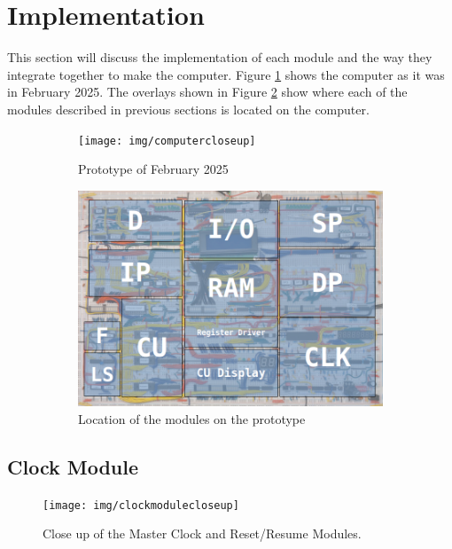 \section{Implementation} \label{sec:implementation}
This section will discuss the implementation of each module and the way they integrate together to make the computer. Figure \ref{fig:prototypea} shows the computer as it was in February 2025. The overlays shown in Figure \ref{fig:prototypeb} show where each of the modules described in previous sections is located on the computer.

\begin{figure}[H]
  \centering
  \begin{subfigure}{0.9\linewidth}
    \centering
    \texttt{[image: img/computercloseup]}
    \caption{Prototype of February 2025}
    \label{fig:prototypea}
  \end{subfigure}
  \vspace{\baselineskip}
  \begin{subfigure}{0.9\linewidth}
    \centering
    \includegraphics[width=0.8\linewidth]{img/computerparts}
    \caption{Location of the modules on the prototype}
    \label{fig:prototypeb}
  \end{subfigure}
  \caption{}
  \label{fig:prototype}
\end{figure}


\subsection{Clock Module} \label{sec:clock}
\begin{figure}[H]
  \centering
  \texttt{[image: img/clockmodulecloseup]}
  \caption{Close up of the Master Clock and Reset/Resume Modules.}
  \label{fig:masterclockcloseup}
\end{figure}


